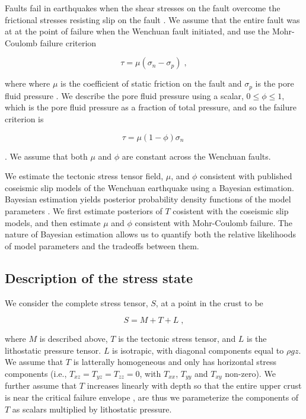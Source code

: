 \documentclass[twocolumn,jgrga]{AGUTeX}
\begin{document}
\begin{article}
Faults fail in earthquakes when the shear stresses on the fault overcome
the frictional stresses resisting slip on the fault \citep[e.g.,][]
{scholz2002}. We assume that the entire fault was at at the point of
failure when the Wenchuan fault initiated, and use the Mohr-Coulomb
failure criterion

\begin{equation} 
\tau = \mu ( \sigma_n - \sigma_p ) \; ,
\label{eqn:amonton_raw} 
\end{equation}

where where $\mu$ is the coefficient of static friction on the fault and
$\sigma_p$ is the pore fluid pressure \citep[e.g.,][]{sibson1985}. We
describe the pore fluid pressure using a scalar, $0 \leq \phi \leq 1$,
which is the pore fluid pressure as a fraction of total pressure, and so
the failure criterion is

\begin{equation} 
\tau = \mu (1 - \phi) \sigma_n \; 
\label{eqn:amonton} 
\end{equation}

\citep[e.g.,][]{sibson1985}. We assume that both $\mu$ and $\phi$ are
constant across the Wenchuan faults.

We estimate the tectonic stress tensor field, $\mu$, and $\phi$
consistent with published coseismic slip models of the Wenchuan
earthquake using a Bayesian estimation. Bayesian estimation yields
posterior probability density functions of the model parameters \citep[e.g.,]
[]{mosegaard1995}. We first estimate posteriors of $T$ cosistent with
the coseismic slip models, and then estimate $\mu$ and $\phi$ consistent
with Mohr-Coulomb failure. The nature of Bayesian estimation allows us
to quantify both the relative likelihoods of model parameters and the
tradeoffs between them.

\subsection{Description of the stress
state}\label{description-of-the-stress-state}

We consider the complete stress tensor, $S$, at a point in the crust to
be

\begin{equation}
S = M + T + L \; ,
\end{equation}

where $M$ is described above, $T$ is the tectonic stress tensor, and $L$
is the lithostatic pressure tensor. $L$ is isotrapic, with diagonal
components equal to $\rho g z$. We assume that $T$ is latterally
homogeneous and only has horizontal stress components (i.e.,
$T_{xz} = T_{yz} = T_{zz} = 0$, with $T_{xx}$, $T_{yy}$ and $T_{xy}$
non-zero). We further assume that $T$ increases linearly with depth so
that the entire upper crust is near the critical failure envelope
\citep[e.g.,][]{townend2000}, are thus we parameterize the components of $T$
as scalars multiplied by lithostatic pressure.


\end{article}
\end{document}
